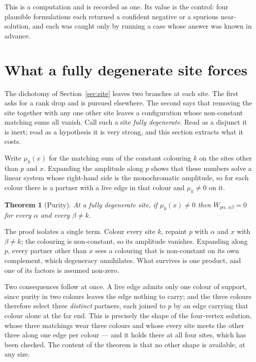 \documentclass[11pt]{article}
\newtheorem{theorem}{Theorem}[section]
\theoremstyle{definition}
\theoremstyle{remark}
\begin{document}
This is a computation and is recorded as one. Its value is the control: four plausible
formulations each returned a confident negative or a spurious near-solution, and each was
caught only by running a case whose answer was known in advance.

\section{What a fully degenerate site forces}\label{sec:fan}

The dichotomy of Section~\ref{sec:site} leaves two branches at each site. The first
asks for a rank drop and is pursued elsewhere. The second says that removing the site
together with any one other site leaves a configuration whose non-constant matching
sums all vanish. Call such a site \emph{fully degenerate}. Read as a disjunct it is
inert; read as a hypothesis it is very strong, and this section extracts what it costs.

Write $\mu_k(x)$ for the matching sum of the constant colouring $k$ on the sites other
than $p$ and $x$. Expanding the amplitude along $p$ shows that these numbers solve a
linear system whose right-hand side is the monochromatic amplitude, so for each colour
there is a partner with a live edge in that colour and $\mu_k \neq 0$ on it.

\begin{theorem}[Purity]\label{thm:purity}
At a fully degenerate site, if $\mu_k(x) \neq 0$ then $W_{p\alpha,\,x\beta} = 0$ for
every $\alpha$ and every $\beta \neq k$.
\end{theorem}

The proof isolates a single term. Colour every site $k$, repaint $p$ with $\alpha$ and
$x$ with $\beta \neq k$; the colouring is non-constant, so its amplitude vanishes.
Expanding along $p$, every partner other than $x$ sees a colouring that is non-constant
on its own complement, which degeneracy annihilates. What survives is one product, and
one of its factors is assumed non-zero.

Two consequences follow at once. A live edge admits only one colour of support, since
purity in two colours leaves the edge nothing to carry; and the three colours therefore
select three \emph{distinct} partners, each joined to $p$ by an edge carrying that
colour alone at the far end. This is precisely the shape of the four-vertex solution,
whose three matchings wear three colours and whose every site meets the other three
along one edge per colour --- and it holds there at all four sites, which has been
checked. The content of the theorem is that no other shape is available, at any size.
\end{document}
